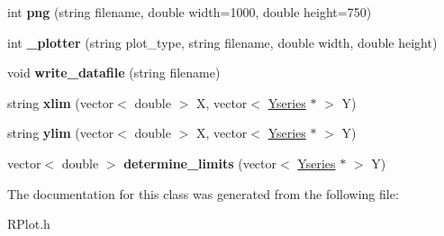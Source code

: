 \begin{DoxyCompactItemize}
\item 
\hypertarget{classRPlot_a68b6837eaf2fd5b0c507232cab2e8556}{}int {\bfseries png} (string filename, double width=1000, double height=750)\label{classRPlot_a68b6837eaf2fd5b0c507232cab2e8556}

\item 
\hypertarget{classRPlot_acb6587e142ae8f956b25df31df03ab68}{}int {\bfseries \+\_\+plotter} (string plot\+\_\+type, string filename, double width, double height)\label{classRPlot_acb6587e142ae8f956b25df31df03ab68}

\item 
\hypertarget{classRPlot_aad36764d50f156772b941724c2d5b3a4}{}void {\bfseries write\+\_\+datafile} (string filename)\label{classRPlot_aad36764d50f156772b941724c2d5b3a4}

\item 
\hypertarget{classRPlot_a825904f102a043e9c8324d4bee4e7fb8}{}string {\bfseries xlim} (vector$<$ double $>$ X, vector$<$ \hyperlink{classYseries}{Yseries} $\ast$ $>$ Y)\label{classRPlot_a825904f102a043e9c8324d4bee4e7fb8}

\item 
\hypertarget{classRPlot_a68d8faba8df754f11fd6d04d1f0cc61a}{}string {\bfseries ylim} (vector$<$ double $>$ X, vector$<$ \hyperlink{classYseries}{Yseries} $\ast$ $>$ Y)\label{classRPlot_a68d8faba8df754f11fd6d04d1f0cc61a}

\item 
\hypertarget{classRPlot_afab1cb327dcd2a9d575f800863ebece5}{}vector$<$ double $>$ {\bfseries determine\+\_\+limits} (vector$<$ \hyperlink{classYseries}{Yseries} $\ast$ $>$ Y)\label{classRPlot_afab1cb327dcd2a9d575f800863ebece5}

\end{DoxyCompactItemize}


The documentation for this class was generated from the following file\+:\begin{DoxyCompactItemize}
\item 
R\+Plot.\+h\end{DoxyCompactItemize}
